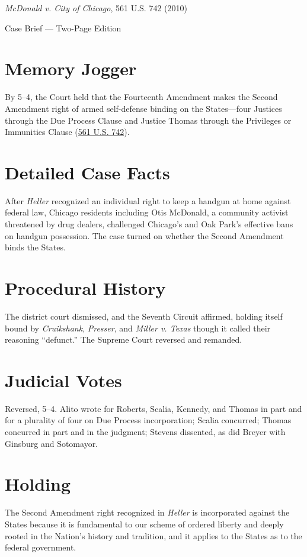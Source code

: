 \documentclass[12pt]{article}
\begin{document}
\begin{center}
{\LARGE \textit{McDonald v. City of Chicago}, 561 U.S. 742 (2010)\par}
\vspace{0.5em}
{\large Case Brief --- Two-Page Edition\par}
\end{center}

\section{Memory Jogger}
By 5--4, the Court held that the Fourteenth Amendment makes the Second Amendment right of armed self-defense binding on the States---four Justices through the Due Process Clause and Justice Thomas through the Privileges or Immunities Clause (\href{https://www.courtlistener.com/opinion/149702/mcdonald-v-city-of-chicago/}{561 U.S. 742}).

\section{Detailed Case Facts}
After \textit{Heller} recognized an individual right to keep a handgun at home against federal law, Chicago residents including Otis McDonald, a community activist threatened by drug dealers, challenged Chicago's and Oak Park's effective bans on handgun possession. The case turned on whether the Second Amendment binds the States.

\section{Procedural History}
The district court dismissed, and the Seventh Circuit affirmed, holding itself bound by \textit{Cruikshank}, \textit{Presser}, and \textit{Miller v. Texas} though it called their reasoning ``defunct.'' The Supreme Court reversed and remanded.

\section{Judicial Votes}
Reversed, 5--4. Alito wrote for Roberts, Scalia, Kennedy, and Thomas in part and for a plurality of four on Due Process incorporation; Scalia concurred; Thomas concurred in part and in the judgment; Stevens dissented, as did Breyer with Ginsburg and Sotomayor.

\section{Holding}
The Second Amendment right recognized in \textit{Heller} is incorporated against the States because it is fundamental to our scheme of ordered liberty and deeply rooted in the Nation's history and tradition, and it applies to the States as to the federal government.
\end{document}
